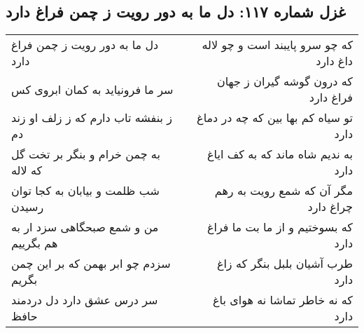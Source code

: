 \begin{center}
\section*{غزل شماره ۱۱۷: دل ما به دور رویت ز چمن فراغ دارد}
\label{sec:sh117}
\begin{longtable}{l p{0.5cm} r}
دل ما به دور رویت ز چمن فراغ دارد
&&
که چو سرو پایبند است و چو لاله داغ دارد
\\
سر ما فرونیاید به کمان ابروی کس
&&
که درون گوشه گیران ز جهان فراغ دارد
\\
ز بنفشه تاب دارم که ز زلف او زند دم
&&
تو سیاه کم بها بین که چه در دماغ دارد
\\
به چمن خرام و بنگر بر تخت گل که لاله
&&
به ندیم شاه ماند که به کف ایاغ دارد
\\
شب ظلمت و بیابان به کجا توان رسیدن
&&
مگر آن که شمع رویت به رهم چراغ دارد
\\
من و شمع صبحگاهی سزد ار به هم بگرییم
&&
که بسوختیم و از ما بت ما فراغ دارد
\\
سزدم چو ابر بهمن که بر این چمن بگریم
&&
طرب آشیان بلبل بنگر که زاغ دارد
\\
سر درس عشق دارد دل دردمند حافظ
&&
که نه خاطر تماشا نه هوای باغ دارد
\\
\end{longtable}
\end{center}
